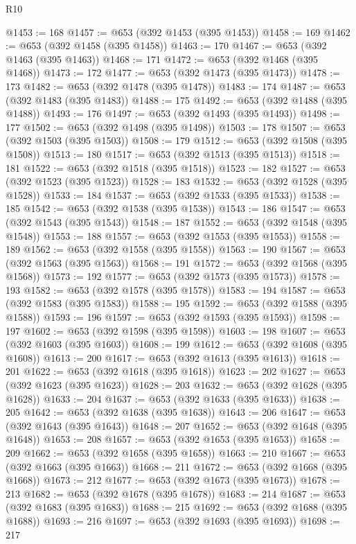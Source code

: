 \begin{lexlean}{R10}
\begin{coremodule}
@1453 := 168
@1457 := @653 (@392 @1453 (@395 @1453))
@1458 := 169
@1462 := @653 (@392 @1458 (@395 @1458))
@1463 := 170
@1467 := @653 (@392 @1463 (@395 @1463))
@1468 := 171
@1472 := @653 (@392 @1468 (@395 @1468))
@1473 := 172
@1477 := @653 (@392 @1473 (@395 @1473))
@1478 := 173
@1482 := @653 (@392 @1478 (@395 @1478))
@1483 := 174
@1487 := @653 (@392 @1483 (@395 @1483))
@1488 := 175
@1492 := @653 (@392 @1488 (@395 @1488))
@1493 := 176
@1497 := @653 (@392 @1493 (@395 @1493))
@1498 := 177
@1502 := @653 (@392 @1498 (@395 @1498))
@1503 := 178
@1507 := @653 (@392 @1503 (@395 @1503))
@1508 := 179
@1512 := @653 (@392 @1508 (@395 @1508))
@1513 := 180
@1517 := @653 (@392 @1513 (@395 @1513))
@1518 := 181
@1522 := @653 (@392 @1518 (@395 @1518))
@1523 := 182
@1527 := @653 (@392 @1523 (@395 @1523))
@1528 := 183
@1532 := @653 (@392 @1528 (@395 @1528))
@1533 := 184
@1537 := @653 (@392 @1533 (@395 @1533))
@1538 := 185
@1542 := @653 (@392 @1538 (@395 @1538))
@1543 := 186
@1547 := @653 (@392 @1543 (@395 @1543))
@1548 := 187
@1552 := @653 (@392 @1548 (@395 @1548))
@1553 := 188
@1557 := @653 (@392 @1553 (@395 @1553))
@1558 := 189
@1562 := @653 (@392 @1558 (@395 @1558))
@1563 := 190
@1567 := @653 (@392 @1563 (@395 @1563))
@1568 := 191
@1572 := @653 (@392 @1568 (@395 @1568))
@1573 := 192
@1577 := @653 (@392 @1573 (@395 @1573))
@1578 := 193
@1582 := @653 (@392 @1578 (@395 @1578))
@1583 := 194
@1587 := @653 (@392 @1583 (@395 @1583))
@1588 := 195
@1592 := @653 (@392 @1588 (@395 @1588))
@1593 := 196
@1597 := @653 (@392 @1593 (@395 @1593))
@1598 := 197
@1602 := @653 (@392 @1598 (@395 @1598))
@1603 := 198
@1607 := @653 (@392 @1603 (@395 @1603))
@1608 := 199
@1612 := @653 (@392 @1608 (@395 @1608))
@1613 := 200
@1617 := @653 (@392 @1613 (@395 @1613))
@1618 := 201
@1622 := @653 (@392 @1618 (@395 @1618))
@1623 := 202
@1627 := @653 (@392 @1623 (@395 @1623))
@1628 := 203
@1632 := @653 (@392 @1628 (@395 @1628))
@1633 := 204
@1637 := @653 (@392 @1633 (@395 @1633))
@1638 := 205
@1642 := @653 (@392 @1638 (@395 @1638))
@1643 := 206
@1647 := @653 (@392 @1643 (@395 @1643))
@1648 := 207
@1652 := @653 (@392 @1648 (@395 @1648))
@1653 := 208
@1657 := @653 (@392 @1653 (@395 @1653))
@1658 := 209
@1662 := @653 (@392 @1658 (@395 @1658))
@1663 := 210
@1667 := @653 (@392 @1663 (@395 @1663))
@1668 := 211
@1672 := @653 (@392 @1668 (@395 @1668))
@1673 := 212
@1677 := @653 (@392 @1673 (@395 @1673))
@1678 := 213
@1682 := @653 (@392 @1678 (@395 @1678))
@1683 := 214
@1687 := @653 (@392 @1683 (@395 @1683))
@1688 := 215
@1692 := @653 (@392 @1688 (@395 @1688))
@1693 := 216
@1697 := @653 (@392 @1693 (@395 @1693))
@1698 := 217

\end{coremodule}
\end{lexlean}
